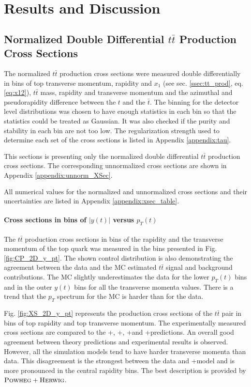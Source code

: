 \chapter{Results and Discussion}\label{chapt:results}

\section{Normalized Double Differential $t\bar{t}$ Production Cross Sections}\label{ssec:xsec_mes}

The normalized $t\bar{t}$ production cross sections were measured double differentially in bins of top transverse momentum, rapidity and  $x_{1}$
(see sec. \ref{ssec:tt_prod}, eq. \ref{eq:x12}),
$t\bar{t}$ mass, rapidity and transverse momentum and the azimuthal and pseudorapidity difference between the $t$ and the $\bar{t}$.
The binning for the detector level distributions was chosen to have enough statistics in each bin so that the statistics could be treated as Gaussian.
It was also checked if the purity and stability in each bin are not too low.
The regularization strength used to determine each set of the cross sections is listed in Appendix \ref{appendix:tau}.

This sections is presenting only the normalized double differential $t\bar{t}$ production cross sections. The corresponding
unnormalized cross sections are shown in Appendix \ref{appendix:unnorm_XSec}. 

All numerical values for the normalized and unnormalized cross sections
and their uncertainties are listed in Appendix \ref{appendix:xsec_table}.

\subsubsection{Cross sections in bins of $|y(t)|$ versus $p_{T}(t)$}

The $t\bar{t}$ production cross sections in bins of the rapidity and the transverse momentum of the top quark was
measured in the bins presented in Fig. \ref{fig:CP_2D_y_pt}. The shown control distribution is also demonstrating the agreement between 
the data and the MC estimated $t\bar{t}$ signal and background contributions. The MC slightly underestimates the data for 
the lower $p_{T}(t)$ bins and in the outer $y(t)$ bins for all the transverse momenta values. There is a trend that the $p_{T}$
spectrum for the MC is harder than for the data.

Fig. \ref{fig:XS_2D_y_pt} represents the production cross sections of the $t\bar{t}$ pair in bins of top rapidity and top transverse momentum.
The experimentally measured cross sections are compared to the \MG+\PYTHIA, \Powheg+\PYTHIA, \Powheg+\HERWIG and \MCNLO+\HERWIG predictions.
An overall good agreement between theory predictions and experimental results is observed. However, all the simulation models tend to have 
harder transverse momenta than data. This disagreement is the strongest between the data and \MG+\PYTHIA model and is more pronounced in the 
central rapidity bins. The best description is provided by $\textsc{Powheg}+\textsc{Herwig}$.


